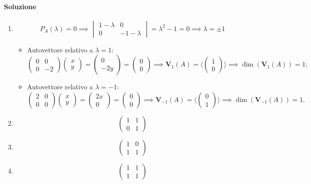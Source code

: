 \documentclass{article}
\theoremstyle{plain}
\theoremstyle{definition}
\theoremstyle{remark}
\begin{document}
\paragraph{Soluzione}
\begin{enumerate}
    \item \[P_A(\lambda)=0\implies\begin{vmatrix}1-\lambda&0\\0&-1-\lambda\end{vmatrix}=\lambda^2-1=0\implies \lambda=\pm1\]
    \begin{itemize}
        \item Autovettore relativo a \( \lambda = 1 \): \[\begin{pmatrix}0&0\\0&-2\end{pmatrix}\begin{pmatrix}x\\y\end{pmatrix}=\begin{pmatrix}0\\-2y\end{pmatrix}=\begin{pmatrix}0\\0\end{pmatrix}\implies \mathbf{V}_1(A)=\langle\begin{pmatrix}1\\0\end{pmatrix}\rangle\implies \dim(\mathbf{V}_1(A))=1;\]
        \item Autovettore relativo a \( \lambda = -1 \): \[\begin{pmatrix}2&0\\0&0\end{pmatrix}\begin{pmatrix}x\\y\end{pmatrix}=\begin{pmatrix}2x\\0\end{pmatrix}=\begin{pmatrix}0\\0\end{pmatrix}\implies \mathbf{V}_{-1}(A)=\langle\begin{pmatrix}0\\1\end{pmatrix}\rangle\implies \dim(\mathbf{V}_{-1}(A))=1.\]
    \end{itemize}
    \item \[\begin{pmatrix}1&1\\0&1\end{pmatrix}\]
    \item \[\begin{pmatrix}1&0\\1&1\end{pmatrix}\]
    \item \[\begin{pmatrix}1&1\\1&1\end{pmatrix}\]
\end{enumerate}
\end{document}
